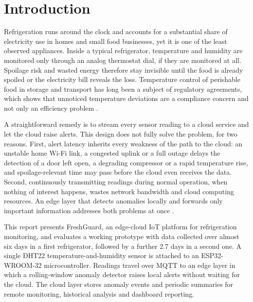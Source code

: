 \documentclass[conference]{IEEEtran}
\begin{document}
\section{Introduction}
Refrigeration runs around the clock and accounts for a substantial share of electricity use in homes and small food businesses, yet it is one of the least observed appliances. Inside a typical refrigerator, temperature and humidity are monitored only through an analog thermostat dial, if they are monitored at all. Spoilage risk and wasted energy therefore stay invisible until the food is already spoiled or the electricity bill reveals the loss. Temperature control of perishable food in storage and transport has long been a subject of regulatory agreements, which shows that unnoticed temperature deviations are a compliance concern and not only an efficiency problem \cite{atp}.

A straightforward remedy is to stream every sensor reading to a cloud service and let the cloud raise alerts. This design does not fully solve the problem, for two reasons. First, alert latency inherits every weakness of the path to the cloud: an unstable home Wi-Fi link, a congested uplink or a full outage delays the detection of a door left open, a degrading compressor or a rapid temperature rise, and spoilage-relevant time may pass before the cloud even receives the data. Second, continuously transmitting readings during normal operation, when nothing of interest happens, wastes network bandwidth and cloud computing resources. An edge layer that detects anomalies locally and forwards only important information addresses both problems at once \cite{shi}.

This report presents FreshGuard, an edge-cloud IoT platform for refrigeration monitoring, and evaluates a working prototype with data collected over almost six days in a first refrigerator, followed by a further 2.7 days in a second one. A single DHT22 temperature-and-humidity sensor is attached to an ESP32-WROOM-32 microcontroller. Readings travel over MQTT to an edge layer in which a rolling-window anomaly detector raises local alerts without waiting for the cloud. The cloud layer stores anomaly events and periodic summaries for remote monitoring, historical analysis and dashboard reporting.
\end{document}
